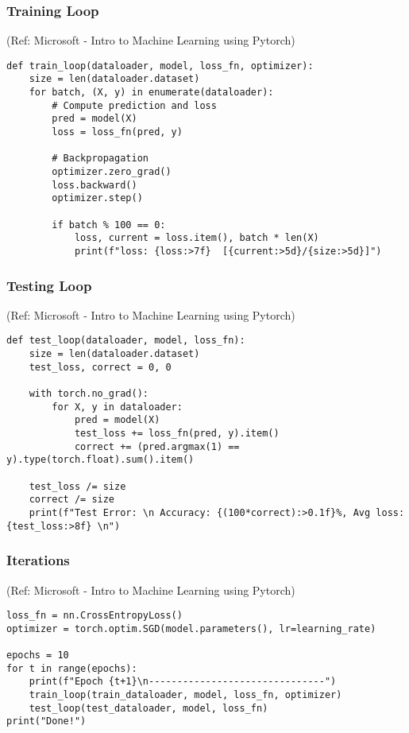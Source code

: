 \begin{frame}[fragile] \frametitle{Training Loop}

\tiny{(Ref: Microsoft - Intro to Machine Learning using Pytorch)}

\begin{lstlisting}
def train_loop(dataloader, model, loss_fn, optimizer):
    size = len(dataloader.dataset)
    for batch, (X, y) in enumerate(dataloader):        
        # Compute prediction and loss
        pred = model(X)
        loss = loss_fn(pred, y)
        
        # Backpropagation
        optimizer.zero_grad()
        loss.backward()
        optimizer.step()

        if batch % 100 == 0:
            loss, current = loss.item(), batch * len(X)
            print(f"loss: {loss:>7f}  [{current:>5d}/{size:>5d}]")
\end{lstlisting}

\end{frame}




\begin{frame}[fragile] \frametitle{Testing Loop}

\tiny{(Ref: Microsoft - Intro to Machine Learning using Pytorch)}

\begin{lstlisting}
def test_loop(dataloader, model, loss_fn):
    size = len(dataloader.dataset)
    test_loss, correct = 0, 0

    with torch.no_grad():
        for X, y in dataloader:
            pred = model(X)
            test_loss += loss_fn(pred, y).item()
            correct += (pred.argmax(1) == y).type(torch.float).sum().item()
            
    test_loss /= size
    correct /= size
    print(f"Test Error: \n Accuracy: {(100*correct):>0.1f}%, Avg loss: {test_loss:>8f} \n")
\end{lstlisting}

\end{frame}


\begin{frame}[fragile] \frametitle{Iterations}

\tiny{(Ref: Microsoft - Intro to Machine Learning using Pytorch)}


\begin{lstlisting}
loss_fn = nn.CrossEntropyLoss()
optimizer = torch.optim.SGD(model.parameters(), lr=learning_rate)

epochs = 10
for t in range(epochs):
    print(f"Epoch {t+1}\n-------------------------------")
    train_loop(train_dataloader, model, loss_fn, optimizer)
    test_loop(test_dataloader, model, loss_fn)
print("Done!")
\end{lstlisting}

\end{frame}



